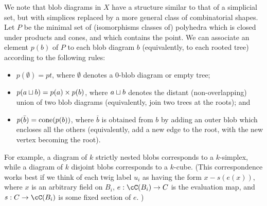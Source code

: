 We note that blob diagrams in $X$ have a structure similar to that of a simplicial set,
but with simplices replaced by a more general class of combinatorial shapes.
Let $P$ be the minimal set of (isomorphisms classes of) polyhedra which is closed under products
and cones, and which contains the point.
We can associate an element $p(b)$ of $P$ to each blob diagram $b$ 
(equivalently, to each rooted tree) according to the following rules:
\begin{itemize}
\item $p(\emptyset) = pt$, where $\emptyset$ denotes a 0-blob diagram or empty tree;
\item $p(a \sqcup b) = p(a) \times p(b)$, where $a \sqcup b$ denotes the distant (non-overlapping) union 
of two blob diagrams (equivalently, join two trees at the roots); and
\item $p(\bar{b}) = \operatorname{cone}(p(b))$, where $\bar{b}$ is obtained from $b$ by adding an outer blob which 
encloses all the others (equivalently, add a new edge to the root, with the new vertex becoming the root).
\end{itemize}
For example, a diagram of $k$ strictly nested blobs corresponds to a $k$-simplex, while
a diagram of $k$ disjoint blobs corresponds to a $k$-cube.
(This correspondence works best if we think of each twig label $u_i$ as having the form
$x - s(e(x))$, where $x$ is an arbitrary field on $B_i$, $e: \cC(B_i) \to C$ is the evaluation map, 
and $s:C \to \cC(B_i)$ is some fixed section of $e$. )


